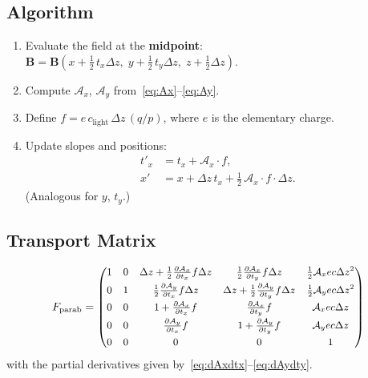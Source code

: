 \documentclass[11pt,a4paper]{article}
\newcommand{\dz}{\Delta z}
\newcommand{\qop}{q/p}
\newcommand{\bvec}[1]{\mathbf{#1}}
\newcommand{\clgt}{c_\text{light}}
\begin{document}
\subsection{Algorithm}

\begin{enumerate}[nosep]
  \item Evaluate the field at the \textbf{midpoint}:
    $\bvec{B} = \bvec{B}(x + \tfrac{1}{2}\,t_x\dz,\; y + \tfrac{1}{2}\,t_y\dz,\; z + \tfrac{1}{2}\dz)$.
  \item Compute $\mathcal{A}_x$, $\mathcal{A}_y$ from~\eqref{eq:Ax}--\eqref{eq:Ay}.
  \item Define $f = e\,\clgt\,\dz\,(\qop)$, where $e$ is the elementary charge.
  \item Update slopes and positions:
    \begin{align}
      t'_x &= t_x + \mathcal{A}_x \cdot f, \\
      x' &= x + \dz\,t_x + \tfrac{1}{2}\,\mathcal{A}_x \cdot f \cdot \dz.
    \end{align}
    (Analogous for $y$, $t_y$.)
\end{enumerate}

\subsection{Transport Matrix}

\begin{equation}
  F_\text{parab} =
  {\small
  \begin{pmatrix}
    1 & 0 & \dz + \frac{1}{2}\frac{\partial\mathcal{A}_x}{\partial t_x}f\dz
      & \frac{1}{2}\frac{\partial\mathcal{A}_x}{\partial t_y}f\dz
      & \frac{1}{2}\mathcal{A}_x ec\dz^2 \\[4pt]
    0 & 1 & \frac{1}{2}\frac{\partial\mathcal{A}_y}{\partial t_x}f\dz
      & \dz + \frac{1}{2}\frac{\partial\mathcal{A}_y}{\partial t_y}f\dz
      & \frac{1}{2}\mathcal{A}_y ec\dz^2 \\[4pt]
    0 & 0 & 1 + \frac{\partial\mathcal{A}_x}{\partial t_x}f
      & \frac{\partial\mathcal{A}_x}{\partial t_y}f
      & \mathcal{A}_x ec\dz \\[4pt]
    0 & 0 & \frac{\partial\mathcal{A}_y}{\partial t_x}f
      & 1 + \frac{\partial\mathcal{A}_y}{\partial t_y}f
      & \mathcal{A}_y ec\dz \\[4pt]
    0 & 0 & 0 & 0 & 1
  \end{pmatrix}
  }
\end{equation}
with the partial derivatives given by~\eqref{eq:dAxdtx}--\eqref{eq:dAydty}.
\end{document}
